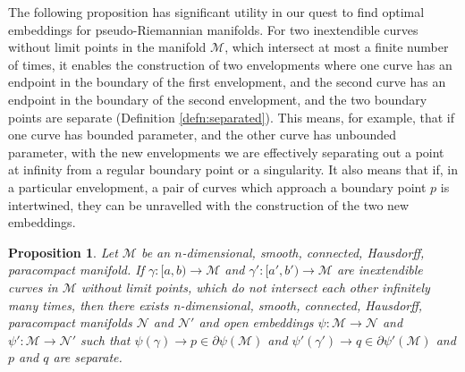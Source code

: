\documentclass[pdflatex,sn-mathphys-num]{sn-jnl}
\newtheorem{prop}[theorem]{Proposition}
\theoremstyle{definition}
\begin{document}
The following proposition has significant utility in our quest to find optimal embeddings for pseudo-Riemannian manifolds. For two inextendible curves without limit points in the manifold $\mathcal{M}$, which intersect at most a finite number of times, it enables the construction of two envelopments where one curve has an endpoint in the boundary of the first envelopment, and the second curve has an endpoint in the boundary of the second envelopment, and the two boundary points are separate (Definition \ref{defn:separated}). This means, for example, that if one curve has bounded parameter, and the other curve has unbounded parameter, with the new envelopments we are effectively separating out a point at infinity from a regular boundary point or a singularity. It also means that if, in a particular envelopment, a pair of curves which approach a boundary point $p$ is intertwined, they can be unravelled with the construction of the two new embeddings.
\begin{prop}\label{prop:simple separate}
    Let $\mathcal{M}$ be an $n$-dimensional, smooth, connected, Hausdorff, paracompact manifold. If $\gamma:[a,b) \rightarrow \mathcal{M}$ and $\gamma':[a',b') \rightarrow \mathcal{M}$ are inextendible curves in $\mathcal{M}$ without limit points, which do not intersect each other infinitely many times, then there exists n-dimensional, smooth, connected, Hausdorff, paracompact manifolds $\mathcal{N}$ and $\mathcal{N}'$ and open embeddings $\psi: \mathcal{M} \rightarrow \mathcal{N}$ and $\psi': \mathcal{M} \rightarrow \mathcal{N'}$ such that $\psi(\gamma) \rightarrow p \in \partial\psi(\mathcal{M})$ and $\psi'(\gamma') \rightarrow q \in \partial\psi'(\mathcal{M})$ and $p$ and $q$ are separate.
\end{prop}
\end{document}
